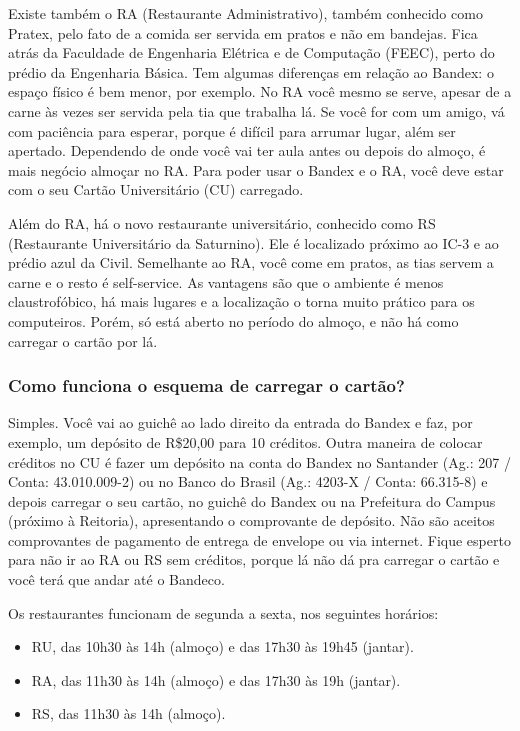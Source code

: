Existe também o RA (Restaurante Administrativo), também conhecido como Pratex,
pelo fato de a comida ser servida em pratos e não em bandejas. Fica atrás da
Faculdade de Engenharia Elétrica e de Computação (FEEC), perto do prédio da Engenharia Básica. Tem algumas diferenças em
relação ao Bandex: o espaço físico é bem menor, por exemplo. No RA você mesmo se
serve, apesar de a carne às vezes ser servida pela tia que trabalha lá. Se você
for com um amigo, vá com paciência para esperar, porque é difícil para arrumar
lugar, além ser apertado. Dependendo de onde você vai ter aula antes ou
depois do almoço, é mais negócio almoçar no RA. Para poder usar o Bandex
e o RA, você deve estar com o seu Cartão Universitário (CU) carregado.

Além do RA, há o novo restaurante universitário, conhecido como RS
(Restaurante Universitário da Saturnino). Ele é localizado próximo ao
IC-3 e ao prédio azul da Civil. Semelhante ao RA, você come em pratos, as tias
servem a carne e o resto é self-service. As vantagens são que o ambiente é menos 
claustrofóbico, há mais lugares e a localização o torna muito prático para os
computeiros. Porém, só está aberto no período do almoço, e não há como carregar
o cartão por lá.

\subsubsection{Como funciona o esquema de carregar o cartão?}

Simples. Você vai ao guichê ao lado direito da entrada do Bandex e faz, por
exemplo, um depósito de R\$20,00 para 10 créditos. Outra maneira de colocar
créditos no CU é fazer um depósito na conta do Bandex no Santander (Ag.: 207
/ Conta: 43.010.009-2) ou no Banco do Brasil (Ag.: 4203-X / Conta: 66.315-8)
e depois carregar o seu cartão, no guichê do Bandex ou na Prefeitura do Campus
(próximo à Reitoria), apresentando o comprovante de depósito. Não são aceitos
comprovantes de pagamento de entrega de envelope ou via internet. Fique esperto
para não ir ao RA ou RS sem créditos, porque lá não dá pra carregar o cartão e você
terá que andar até o Bandeco.

Os restaurantes funcionam de segunda a sexta, nos seguintes horários:

\begin{itemize}
\item  RU, das 10h30 às 14h (almoço) e das 17h30 às 19h45 (jantar).
\item  RA, das 11h30 às 14h (almoço) e das 17h30 às 19h (jantar).
\item  RS, das 11h30 às 14h (almoço).
\end{itemize}

